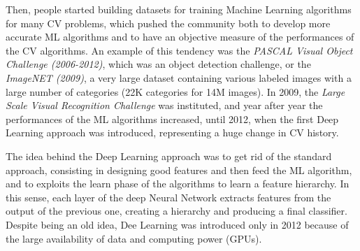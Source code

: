 Then, people started building datasets for training Machine Learning algorithms for many CV problems, which pushed the community both to develop more accurate ML algorithms and to have an objective measure of the performances of the CV algorithms. An example of this tendency was the \textit{PASCAL Visual Object Challenge (2006-2012)}, which was an object detection challenge, or the \textit{ImageNET (2009)}, a very large dataset containing various labeled images with a large number of categories (22K categories for 14M images). In 2009, the \textit{Large Scale Visual Recognition Challenge} was instituted, and year after year the performances of the ML algorithms increased, until 2012, when the first Deep Learning approach was introduced, representing a huge change in CV history. 

The idea behind the Deep Learning approach was to get rid of the standard approach, consisting in designing good features and then feed the ML algorithm, and to exploits the learn phase of the algorithms to learn a feature hierarchy. In this sense, each layer of the deep Neural Network extracts features from the output of the previous one, creating a hierarchy and producing a final classifier. Despite being an old idea, Dee Learning was introduced only in 2012 because of the large availability of data and computing power (GPUs).